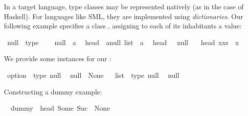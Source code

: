 \begin{isabellebody}
\begin{isamarkuptext}
  In a target language, type classes may be represented
  natively (as in the case of Haskell).  For languages
  like SML, they are implemented using \emph{dictionaries}.
  Our following example specifies a class ,
  assigning to each of its inhabitants a  value:%
\end{isamarkuptext}%
\isamarkuptrue%
\isamarkupfalse%
\ null\ {\isacharequal}\ type\ {\isacharplus}\isanewline
\ \ \ null\ {\isacharcolon}{\isacharcolon}\ {\isacharprime}a\isanewline
\isanewline
{}\isamarkupfalse%
\isanewline
\ \ head\ {\isacharcolon}{\isacharcolon}\ {\isachardoublequoteopen}{\isacharprime}a{\isasymColon}null\ list\ {\isasymRightarrow}\ {\isacharprime}a{\isachardoublequoteclose}\isanewline
{}\isanewline
\ \ {\isachardoublequoteopen}head\ {\isacharbrackleft}{\isacharbrackright}\ {\isacharequal}\ null{\isachardoublequoteclose}\isanewline
\ \ {\isacharbar}\ {\isachardoublequoteopen}head\ {\isacharparenleft}x{\isacharhash}xs{\isacharparenright}\ {\isacharequal}\ x{\isachardoublequoteclose}%
\begin{isamarkuptext}%
We provide some instances for our :%
\end{isamarkuptext}%
\isamarkuptrue%
\isamarkupfalse%
\ option\ {\isacharcolon}{\isacharcolon}\ {\isacharparenleft}type{\isacharparenright}\ null\isanewline
\ \ {\isachardoublequoteopen}null\ {\isasymequiv}\ None{\isachardoublequoteclose}%
\isadelimproof
\ %
\endisadelimproof
%
\isatagproof
\isacommand{{\isachardot}{\isachardot}}\isamarkupfalse%
%
\endisatagproof
{\isafoldproof}%
%
\isadelimproof
%
\endisadelimproof
\isanewline
\isanewline
{}\isamarkupfalse%
\ list\ {\isacharcolon}{\isacharcolon}\ {\isacharparenleft}type{\isacharparenright}\ null\isanewline
\ \ {\isachardoublequoteopen}null\ {\isasymequiv}\ {\isacharbrackleft}{\isacharbrackright}{\isachardoublequoteclose}%
\isadelimproof
\ %
\endisadelimproof
%
\isatagproof
\isacommand{{\isachardot}{\isachardot}}\isamarkupfalse%
%
\endisatagproof
{\isafoldproof}%
%
\isadelimproof
%
\endisadelimproof
%
\begin{isamarkuptext}%
Constructing a dummy example:%
\end{isamarkuptext}%
\isamarkuptrue%
\isamarkupfalse%
\isanewline
\ \ {\isachardoublequoteopen}dummy\ {\isacharequal}\ head\ {\isacharbrackleft}Some\ {\isacharparenleft}Suc\ {}{\isacharparenright}{\isacharcomma}\ None{\isacharbrackright}{\isachardoublequoteclose}%
\begin{isamarkuptext}%

\end{isamarkuptext}
\end{isabellebody}
